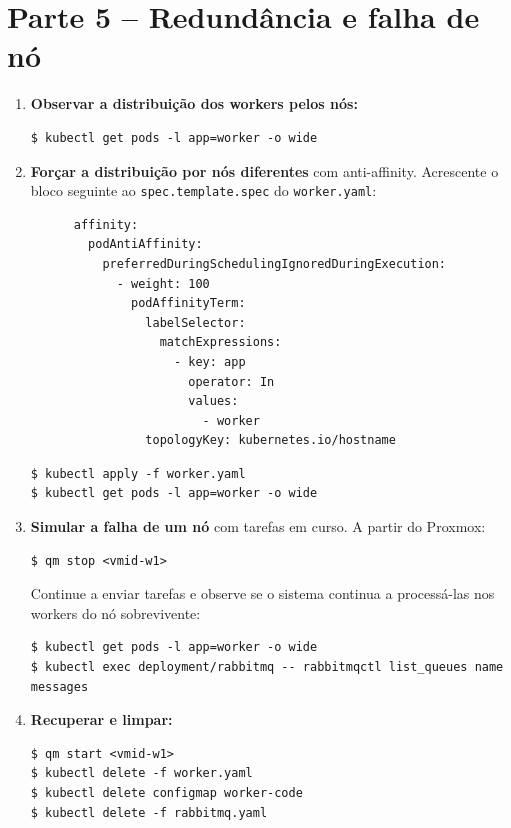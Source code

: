 \documentclass[11pt,a4paper]{article}
\begin{document}
\section{Parte 5 -- Redundância e falha de nó}
\begin{enumerate}[label=\arabic*.,resume]

  \item \textbf{Observar a distribuição dos workers pelos nós:}
\begin{lstlisting}
$ kubectl get pods -l app=worker -o wide
\end{lstlisting}

  \item \textbf{Forçar a distribuição por nós diferentes} com anti-affinity.
  Acrescente o bloco seguinte ao \texttt{spec.template.spec} do \texttt{worker.yaml}:
\begin{lstlisting}
      affinity:
        podAntiAffinity:
          preferredDuringSchedulingIgnoredDuringExecution:
            - weight: 100
              podAffinityTerm:
                labelSelector:
                  matchExpressions:
                    - key: app
                      operator: In
                      values:
                        - worker
                topologyKey: kubernetes.io/hostname
\end{lstlisting}
\begin{lstlisting}
$ kubectl apply -f worker.yaml
$ kubectl get pods -l app=worker -o wide
\end{lstlisting}

  \item \textbf{Simular a falha de um nó} com tarefas em curso. A partir do Proxmox:
\begin{lstlisting}
$ qm stop <vmid-w1>
\end{lstlisting}
  Continue a enviar tarefas e observe se o sistema continua a processá-las nos workers do nó sobrevivente:
\begin{lstlisting}
$ kubectl get pods -l app=worker -o wide
$ kubectl exec deployment/rabbitmq -- rabbitmqctl list_queues name messages
\end{lstlisting}

  \item \textbf{Recuperar e limpar:}
\begin{lstlisting}
$ qm start <vmid-w1>
$ kubectl delete -f worker.yaml
$ kubectl delete configmap worker-code
$ kubectl delete -f rabbitmq.yaml
\end{lstlisting}

\end{enumerate}
\end{document}
